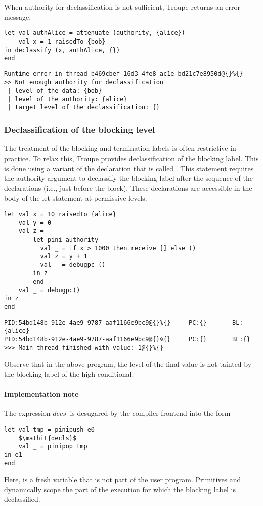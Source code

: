 When authority for declassification is not sufficient, Troupe returns an error message.
\begin{lstlisting}
let val authAlice = attenuate (authority, {alice})
    val x = 1 raisedTo {bob}
in declassify (x, authAlice, {})
end     
\end{lstlisting}

\begin{lstlisting}
Runtime error in thread b469cbef-16d3-4fe8-ac1e-bd21c7e8950d@{}%{}
>> Not enough authority for declassification
 | level of the data: {bob}
 | level of the authority: {alice}
 | target level of the declassification: {}    
\end{lstlisting}

\subsubsection{Declassification of the blocking level}
\label{sec:pinidecl}
The treatment of the blocking and termination labels is often restrictive in practice. To relax this, 
Troupe provides declassification of the blocking label. This is done using 
a variant of the  declaration that is called . 
This statement requires the authority argument to declassify the blocking label 
after the sequence of the declarations (i.e., just before the  block).
These declarations are accessible in the body of the let statement at permissive
levels.

\begin{lstlisting}
let val x = 10 raisedTo {alice}
    val y = 0
    val z = 
        let pini authority
          val _ = if x > 1000 then receive [] else ()
          val z = y + 1
          val _ = debugpc () 
        in z
        end
    val _ = debugpc()
in z
end
\end{lstlisting}

\begin{verbatim}
PID:54bd148b-912e-4ae9-9787-aaf1166e9bc9@{}%{}     PC:{}       BL:{alice}           
PID:54bd148b-912e-4ae9-9787-aaf1166e9bc9@{}%{}     PC:{}       BL:{}            
>>> Main thread finished with value: 1@{}%{}
\end{verbatim}
Observe that in the above program, the level of the final value 
is not tainted by the blocking label of the high conditional. 


\paragraph{Implementation note}
The expression  $\mathit{decs}\ $ is desugared by the compiler frontend into the form 
\begin{lstlisting}
let val tmp = pinipush e0 
    $\mathit{decls}$
    val _ = pinipop tmp
in e1      
end
\end{lstlisting}
Here,  is a fresh variable that is not part of the user program. Primitives  and 
 dynamically scope the part of the execution for which the blocking label is declassified.





